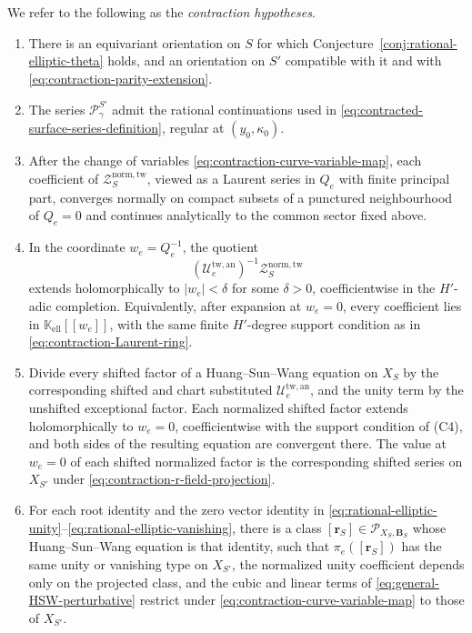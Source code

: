 \documentclass{amsart}
\theoremstyle{definition}
\numberwithin{equation}{section}
\newcommand{\K}{\mathbb K}
\begin{document}
We refer to the following as the \emph{contraction hypotheses}.
\begin{enumerate}
\item[(C1)] There is an equivariant orientation on \(S\) for which Conjecture~\ref{conj:rational-elliptic-theta} holds, and an orientation on \(S'\) compatible with it and with \eqref{eq:contraction-parity-extension}.

\item[(C2)] The series \(\mathcal P_{\gamma}^{S'}\) admit the rational continuations used in \eqref{eq:contracted-surface-series-definition}, regular at \((y_0,\kappa_0)\).

\item[(C3)] After the change of variables \eqref{eq:contraction-curve-variable-map}, each coefficient of \(\mathcal Z_S^{\mathrm{norm,tw}}\), viewed as a Laurent series in \(Q_e\) with finite principal part, converges normally on compact subsets of a punctured neighbourhood of \(Q_e=0\) and continues analytically to the common sector fixed above.

\item[(C4)] In the coordinate \(w_e=Q_e^{-1}\), the quotient
\begin{equation}
 (\mathcal U_e^{\mathrm{tw,an}})^{-1}
 \mathcal Z_S^{\mathrm{norm,tw}}
\label{eq:contraction-normalized-quotient}
\end{equation}
extends holomorphically to \(|w_e|<\delta\) for some \(\delta>0\), coefficientwise in the \(H'\)-adic completion.  Equivalently, after expansion at \(w_e=0\), every coefficient lies in \(\K_{\mathrm{ell}}[[w_e]]\), with the same finite \(H'\)-degree support condition as in \eqref{eq:contraction-Laurent-ring}.

\item[(C5)] Divide every shifted factor of a Huang--Sun--Wang equation on \(X_S\) by the corresponding shifted and chart substituted \(\mathcal U_e^{\mathrm{tw,an}}\), and the unity term by the unshifted exceptional factor.  Each normalized shifted factor extends holomorphically to \(w_e=0\), coefficientwise with the support condition of \textup{(C4)}, and both sides of the resulting equation are convergent there.  The value at \(w_e=0\) of each shifted normalized factor is the corresponding shifted series on \(X_{S'}\) under \eqref{eq:contraction-r-field-projection}.

\item[(C6)] For each root identity and the zero vector identity in \eqref{eq:rational-elliptic-unity}--\eqref{eq:rational-elliptic-vanishing}, there is a class \([\mathbf r_S]\in\mathcal P_{X_S,\mathbf B_S}\) whose Huang--Sun--Wang equation is that identity, such that \(\pi_e([\mathbf r_S])\) has the same unity or vanishing type on \(X_{S'}\), the normalized unity coefficient depends only on the projected class, and the cubic and linear terms of \eqref{eq:general-HSW-perturbative} restrict under \eqref{eq:contraction-curve-variable-map} to those of \(X_{S'}\).
\end{enumerate}
\end{document}
